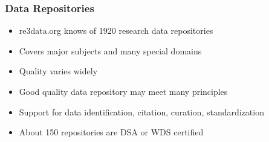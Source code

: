 \documentclass{beamer}
\begin{document}
{
	\begin{frame}[plain]
	\end{frame}
}

\begin{frame}
  \frametitle{Data Repositories}
  
  \begin{itemize}
  \item re3data.org knows of 1920 research data repositories
  \item Covers major subjects and many special domains
  \item Quality varies widely
  \item Good quality data repository may meet many principles
  \item Support for data identification, citation, curation, standardization
  \item About 150 repositories are DSA or WDS certified
  \end{itemize}
\end{frame}

{
	\begin{frame}[plain]
	\end{frame}
}
\end{document}
